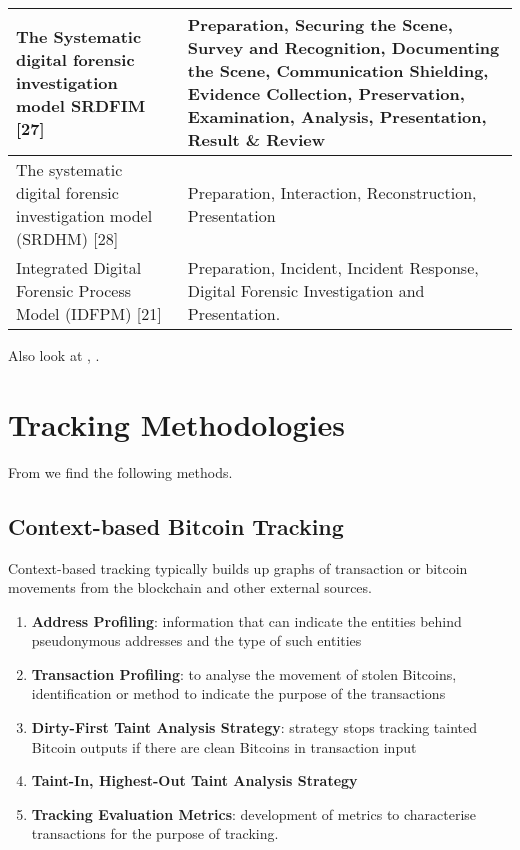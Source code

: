 \documentclass{article}
\begin{document}
\begin{table}[h!]
\begin{tabular}{ |p{7.5cm}|p{8cm}|  }
  \hline
  The Systematic digital forensic investigation model SRDFIM [27] & Preparation, Securing the Scene, Survey and Recognition, Documenting the Scene, Communication Shielding, Evidence Collection, Preservation, Examination, Analysis, Presentation, Result \& Review \\
  \hline
  The systematic digital forensic investigation model (SRDHM) [28] & Preparation, Interaction, Reconstruction, Presentation \\
  \hline
  Integrated Digital Forensic Process Model (IDFPM) [21] & Preparation, Incident, Incident Response, Digital Forensic Investigation and Presentation. \\
  \hline
\end{tabular}
\label{table: ModelsFromLiterature}
\end{table}

\pagebreak

Also look at \cite{Zollner:2019}, \cite{Holub:2018} \cite{Young:2021}.

\section{Tracking Methodologies}

From  \autocite{Tironsakkul:2022} we find the following methods.

\subsection{Context-based Bitcoin Tracking}

Context-based tracking typically builds up graphs of transaction or bitcoin movements from the blockchain and other external sources.

\begin{enumerate}
\item \textbf{Address Profiling}: information that can indicate the entities behind pseudonymous addresses and the type of such entities
\item \textbf{Transaction Profiling}: to analyse the movement of stolen Bitcoins, identification or method to indicate the purpose of the transactions
\item \textbf{Dirty-First Taint Analysis Strategy}: strategy stops tracking tainted Bitcoin outputs if there are clean Bitcoins in transaction input
\item \textbf{Taint-In, Highest-Out  Taint Analysis Strategy}
\item \textbf{Tracking Evaluation Metrics}: development of metrics to characterise transactions for the purpose of tracking.
  
\end{enumerate}
\end{document}
